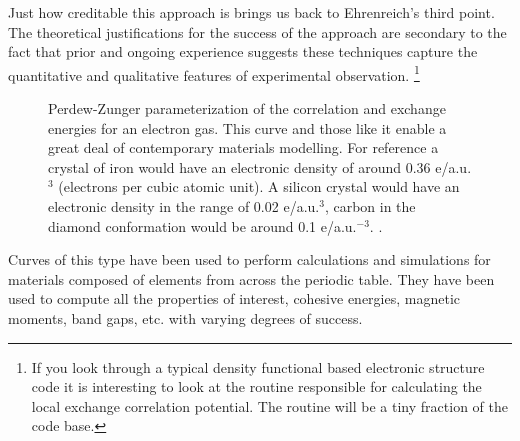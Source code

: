 Just how creditable this approach is brings us back to Ehrenreich's third point.
The theoretical justifications for the success of the approach are
secondary to the fact that prior and ongoing experience suggests 
these techniques capture the quantitative and qualitative features
of experimental observation. 
\footnote{If you look through a typical density functional based electronic structure code 
it is interesting to look at the routine responsible for calculating 
the local exchange correlation potential. The routine will be a tiny fraction of the code base.}
%
\begin{figure}
\begin{center}
\graphicspath{{./intro/}}
\caption{Perdew-Zunger parameterization of the correlation and exchange energies 
for an electron gas. This curve and those like it enable a great deal of 
contemporary materials modelling. For reference
a crystal of iron would have an electronic density of 
around 0.36 e/a.u.$^{3}$ (electrons per cubic
atomic unit). A silicon crystal would have an electronic density in the 
range of 0.02 e/a.u.$^{3}$, carbon in the diamond conformation 
would be around 0.1 e/a.u.$^{-3}$.  
\label{fig:ldapz}.}
\end{center}
\end{figure}
%
Curves of this type have been used to perform calculations and simulations for 
materials composed of elements from across the periodic table. They have been
used to compute all the properties of interest, cohesive energies, magnetic moments, 
band gaps, etc. with varying degrees of success.



